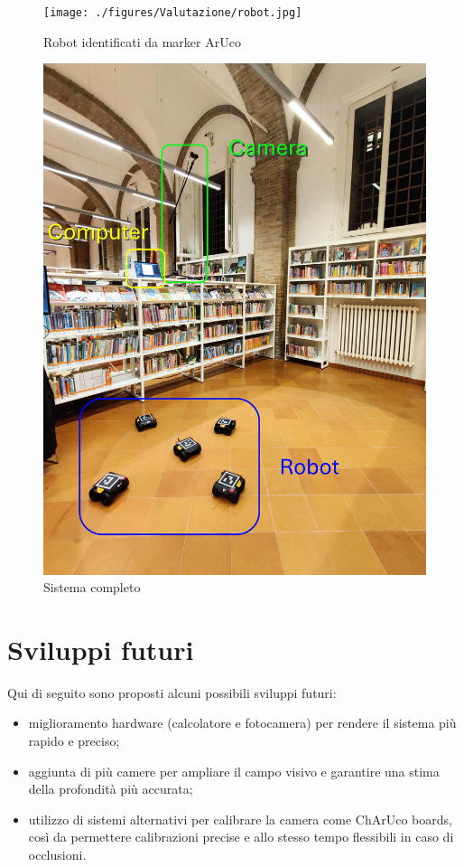 \documentclass[12pt,a4paper,openright,twoside]{book}
\begin{document}
\begin{figure}[h!]
	\centering
	\texttt{[image: ./figures/Valutazione/robot.jpg]}
	\caption{Robot identificati da marker ArUco}
	\label{fig:robot}
\end{figure}

\begin{figure}[h!]
	\centering
	\includegraphics[width=0.6\linewidth]{./figures/Valutazione/robot1.jpg}
	\caption{Sistema completo}
	\label{fig:system}
\end{figure}

\section{Sviluppi futuri}
Qui di seguito sono proposti alcuni possibili sviluppi futuri:
\begin{itemize}
	\item miglioramento hardware (calcolatore e fotocamera) per rendere il sistema più rapido e preciso;
	\item aggiunta di più camere per ampliare il campo visivo e garantire una stima della profondità più accurata;
	\item utilizzo di sistemi alternativi per calibrare la camera come ChArUco boards, così da permettere calibrazioni precise e allo stesso tempo flessibili in caso di occlusioni.
\end{itemize}

\end{document}
